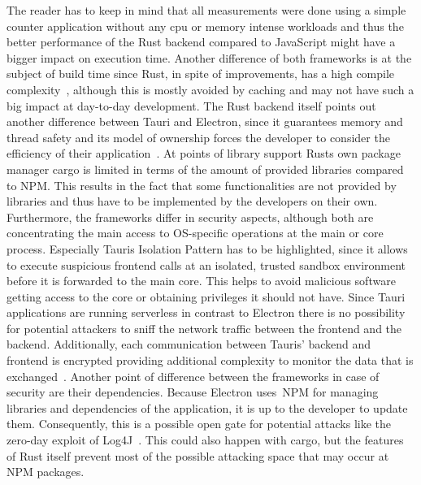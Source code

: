 The reader has to keep in mind that all measurements were done using a simple counter application without any cpu or memory intense workloads and thus the better performance of the Rust backend compared to JavaScript might have a bigger impact on execution time.
Another difference of both frameworks is at the subject of build time since Rust, in spite of improvements, has a high compile complexity~\cite{rustCompileTime}, although this is mostly avoided by caching and may not have such a big impact
at day-to-day development.
The Rust backend itself points out another difference between Tauri and Electron, since it guarantees memory and thread safety and its model of ownership forces the developer to consider the efficiency of their application~\cite{klabnik2019rust}.
At points of library support Rusts own package manager cargo is limited in terms of the amount of provided libraries compared to \ac{NPM}.
This results in the fact that some functionalities are not provided by libraries and thus have to be implemented by the developers on their own.
Furthermore, the frameworks differ in security aspects, although both are concentrating the main access to \ac{OS}-specific operations at the main or core process.
Especially Tauris Isolation Pattern has to be highlighted, since it allows to execute suspicious frontend calls at an isolated, trusted sandbox environment before it is forwarded to the main core.
This helps to avoid malicious software getting access to the core or obtaining privileges it should not have.
Since Tauri applications are running serverless in contrast to Electron there is no possibility for potential attackers to sniff the network traffic between the frontend and the backend.
Additionally, each communication between Tauris' backend and frontend is encrypted providing additional complexity to monitor the data that is exchanged~\cite{tauri}.
Another point of difference between the frameworks in case of security are their dependencies.
Because Electron uses~\ac{NPM} for managing libraries and dependencies of the application, it is up to the developer to update them.
Consequently, this is a possible open gate for potential attacks like the zero-day exploit of Log4J~\cite{bsi}.
This could also happen with cargo, but the features of Rust itself prevent most of the possible attacking space that may occur at \ac{NPM} packages.



